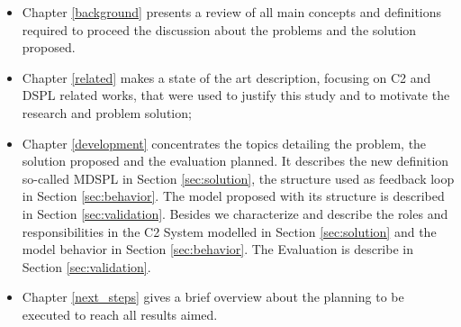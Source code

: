 \begin{itemize}
    \item Chapter \ref{background} presents a review of all main concepts and definitions required to proceed the discussion about the problems and the solution proposed.
    \item Chapter \ref{related} makes a state of the art description, focusing on C2 and DSPL related works, that were used to justify this study and to motivate the research and problem solution;
    \item Chapter \ref{development} concentrates the topics detailing the problem, the solution proposed and the  evaluation planned. It describes the new definition so-called MDSPL in Section \ref{sec:solution}, the structure used as feedback loop in Section \ref{sec:behavior}. The model proposed with its structure is described in Section \ref{sec:validation}. Besides we characterize and describe the roles and responsibilities in the C2 System modelled in Section \ref{sec:solution} and the model behavior in Section \ref{sec:behavior}. The Evaluation is describe in Section \ref{sec:validation}.
    \item Chapter \ref{next_steps} gives a brief overview about the planning to be executed to reach all results aimed.
    
\end{itemize}
